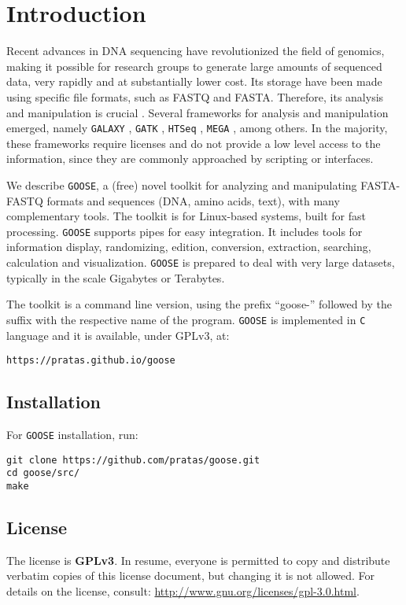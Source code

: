 \chapter{Introduction}
\label{intro}

Recent advances in {DNA} sequencing have revolutionized the field of genomics,
making it possible for research groups to generate large amounts of sequenced
data, very rapidly and at substantially lower cost. Its storage have been
made using specific file formats, such as FASTQ and FASTA. Therefore, its
analysis and manipulation is crucial \cite{Buermans-2014a}. Several
frameworks for analysis and manipulation emerged, namely \texttt{GALAXY}
\cite{Giardine-2005a}, \texttt{GATK} \cite{DePristo-2011a}, \texttt{HTSeq}
\cite{Anders-2014a}, \texttt{MEGA} \cite{Kumar-2016a}, among others.
In the majority, these frameworks require licenses and do not provide
a low level access to the information, since they are commonly approached
by scripting or interfaces.

We describe \texttt{GOOSE}, a (free) novel toolkit for analyzing and manipulating
FASTA-FASTQ formats and sequences (DNA, amino acids, text), with many 
complementary tools. The toolkit is for Linux-based systems, built for fast 
processing. \texttt{GOOSE} supports pipes for easy integration. It includes tools 
for information display, randomizing, edition, conversion, extraction, 
searching, calculation and visualization. \texttt{GOOSE} is prepared to deal with
very large datasets, typically in the scale Gigabytes or Terabytes. 

The toolkit is a command line version, using the prefix ``goose-'' 
followed by the suffix with the respective name of the program.
\texttt{GOOSE} is implemented in \texttt{C} language and it is available, 
under GPLv3, at:
\begin{lstlisting}
https://pratas.github.io/goose
\end{lstlisting}

\section{Installation}

For \texttt{GOOSE} installation, run:
\begin{lstlisting}
git clone https://github.com/pratas/goose.git
cd goose/src/
make
\end{lstlisting}

\section{License}

The license is \textbf{GPLv3}. In resume, everyone is permitted to copy and 
distribute verbatim copies of this license document, but changing it is not 
allowed. For details on the license, consult: \url{http://www.gnu.org/licenses/gpl-3.0.html}.
